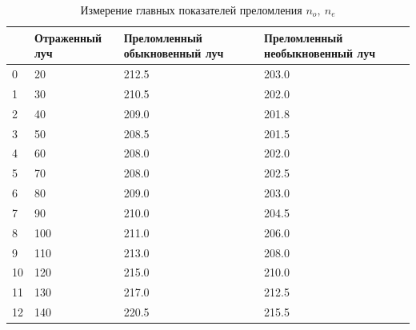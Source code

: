\documentclass[12pt]{article}
\begin{document}
\begin{enumerate}
        \begin{table}
            \centering
            \caption{Измерение главных показателей преломления $n_o,\ n_e$}
            \label{tab:tab2}
            \begin{tabular}{|p{0.5cm}|p{3cm}|p{4cm}|p{4cm}|}
                \hline
                {} & Отраженный луч & Преломленный обыкновенный луч & Преломленный необыкновенный луч \\\hline
                0  & 20             & 212.5                         & 203.0                           \\
                1  & 30             & 210.5                         & 202.0                           \\
                2  & 40             & 209.0                         & 201.8                           \\
                3  & 50             & 208.5                         & 201.5                           \\
                4  & 60             & 208.0                         & 202.0                           \\
                5  & 70             & 208.0                         & 202.5                           \\
                6  & 80             & 209.0                         & 203.0                           \\
                7  & 90             & 210.0                         & 204.5                           \\
                8  & 100            & 211.0                         & 206.0                           \\
                9  & 110            & 213.0                         & 208.0                           \\
                10 & 120            & 215.0                         & 210.0                           \\
                11 & 130            & 217.0                         & 212.5                           \\
                12 & 140            & 220.5                         & 215.5                           \\\hline
            \end{tabular}
        \end{table}
    \end{enumerate}
\end{document}
